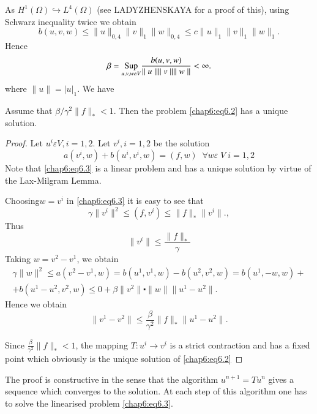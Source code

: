 As $H^1(\Omega)\hookrightarrow L^4(\Omega)$ (see LADYZHENSKAYA \cite{key27}
for a proof of this), using Schwarz inequality twice we obtain
$$
b(u,v,w)\leq\parallel u\parallel_{0,4}\parallel v\parallel_1\parallel
w\parallel_{0,4}\leq c\parallel u\parallel_1\parallel v\parallel_1
\parallel w\parallel_1.
$$
Hence
$$
\beta =\underset{u,v,w\varepsilon V}{\operatorname{Sup}} \frac{b(u,v,w)} {\parallel
u\parallel \parallel v\parallel \parallel w\parallel}<\infty.
$$
where $\parallel u\parallel =|u|_1$. We have 

\begin{THM}\label{chap6:THM5}
Assume that $\beta/\gamma^2\parallel f\parallel_* <1$. Then the
problem \eqref{chap6:eq6.2} has a unique solution.
\end{THM}

\begin{proof}
Let $u^i\varepsilon V, i=1,2$. Let $v^i, i=1,2$ be the solution
\begin{equation}\label{chap6:eq6.3}
a(v^i,w)+b(u^i,v^i,w)=(f,w)\; \; \forall w\varepsilon \;V\;i=1,2
\end{equation}
Note that \eqref{chap6:eq6.3} is a linear problem and has a unique
solution by virtue of the Lax-Milgram Lemma. 

Choosing\pageoriginale $w=v^i$ in \eqref{chap6:eq6.3} it is easy to
see that 
$$
\gamma\parallel v^i\parallel^2\leq(f,v^i)\leq\parallel
f\parallel_*\parallel v^i\parallel.,
$$
Thus 
$$
\parallel v^i\parallel \leq\frac{\parallel f\parallel_*}{\gamma}
$$
Taking $w=v^2-v^1$, we obtain
\begin{equation*}
\begin{split}
\gamma\parallel w\parallel^2\leq a(v^2-v^1,w)=b(u^1,v^1,w)-b(u^2,v^2,
w)=b(u^1,-w,w)+\\
+b(u^1-u^2,v^2,w)\leq 0+\beta\parallel v^2\parallel\centerdot\parallel
w\parallel \parallel u^1-u^2\parallel.
\end{split}
\end{equation*}
Hence we obtain
$$
\parallel v^1-v^2\parallel\leq\frac{\beta}{\gamma^2}\parallel
f\parallel_*\parallel u^1-u^2\parallel.
$$

Since $\frac{\beta}{\gamma^2}\parallel f\parallel_* <1$, the mapping
$T:u^i\to v^i$ is a strict contraction and has a fixed point which
obviously is the unique solution of \eqref{chap6:eq6.2}
\end{proof}

\setcounter{REM}{0}
\begin{REM}\label{chap6:rem1}
The proof is constructive in the sense that the algorithm
$u^{n+1}=Tu^n$ gives a sequence which converges to the solution. At
each step of this algorithm one has to solve the linearised problem
\eqref{chap6:eq6.3}. 
\end{REM}

